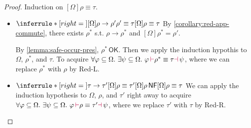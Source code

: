 \documentclass[a4,natbib=false]{article}
\newcommand{\ctxtapp}[2]{[{#1}] {#2}}
\newcommand{\reduces}[2]{{#1} \rightarrow {#2}}
\newcommand{\judgeequivunt}[2]{{#1} \equiv {#2}}
\newcommand{\judgeunify}[4]{{#1}\,{\color{purple}\vdash} {#2} \equiv {#3} {\color{purple}\dashv}\,{#4}}
\newcommand{\judgeSnf}[1]{{#1}\,\mathsf{NF}}
\newcommand{\judgeSokterm}[1]{{#1} \,\mathsf{OK}}
\newcommand{\Infer}[3]{\inferrule*[right={#1}]{#2}{#3}}
\begin{document}
\begin{proof}
  Induction on $\judgeequivunt{\ctxtapp{\Omega}{\rho}}{\tau}$.
  
  \begin{itemize}
  \item
    $
    \Infer{}
      {
        \reduces{\ctxtapp{\Omega}{\rho}}{\rho'}\\
        \judgeequivunt{\rho'}{\tau}
      }
      {
        \judgeequivunt{\ctxtapp{\Omega}{\rho}}{\tau}
      }
      $ By \cref{corollary:red-app-commute}, there exists $\rho^*$ s.t.
      $\reduces{\rho}{\rho^*}$ and $\ctxtapp{\Omega}{\rho^*} = \rho'$.


      By \cref{lemma:safe-occur-pres}, $\judgeSokterm{\rho^*}$.
      Then we apply the induction hypothis to $\Omega$, $\rho^*$, and $\tau$.
      To acquire $\forall \varphi \subseteq \Omega. ~ \exists \psi \subseteq \Omega. ~
      \judgeunify{\varphi}{\rho^*}{\tau}{\psi}$,
      where we can replace $\rho^*$ with $\rho$ by Red-L.

  \item
    $
    \Infer{}
    {
      \reduces{\tau}{\tau'}\\
      \judgeequivunt{\ctxtapp{\Omega}{\rho}}{\tau'}\\
      \judgeSnf{\ctxtapp{\Omega}{\rho}}
    }
    {
      \judgeequivunt{\ctxtapp{\Omega}{\rho}}{\tau}
    }
    $
    We can apply the induction hypothesis to $\Omega$, $\rho$, and $\tau'$ right
    away to acquire $\forall \varphi \subseteq \Omega. ~ \exists \psi \subseteq
    \Omega. ~ \judgeunify{\varphi}{\rho}{\tau'}{\psi}$, where we replace $\tau'$
    with $\tau$ by Red-R.


\end{itemize}
\end{proof}
\end{document}
